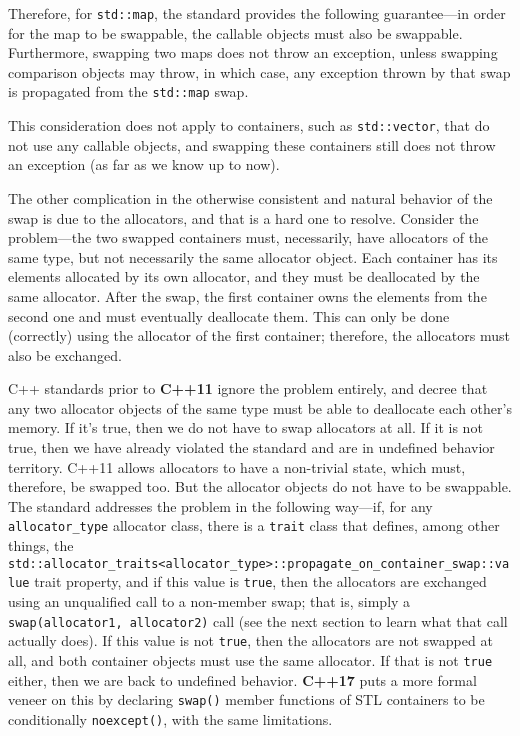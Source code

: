 Therefore, for \texttt{std::map}, the standard provides the following guarantee---in order for the map to be swappable, the callable objects must also be swappable. Furthermore, swapping two maps does not throw an exception, unless swapping comparison objects may throw, in which case, any exception thrown by that swap is propagated from the \texttt{std::map} swap.

This consideration does not apply to containers, such as \texttt{std::vector}, that do not use any callable objects, and swapping these containers still does not throw an exception (as far as we know up to now).

The other complication in the otherwise consistent and natural behavior of the swap is due to the allocators, and that is a hard one to resolve. Consider the problem---the two swapped containers must, necessarily, have allocators of the same type, but not necessarily the same allocator object. Each container has its elements allocated by its own allocator, and they must be deallocated by the same allocator. After the swap, the first container owns the elements from the second one and must eventually deallocate them. This can only be done (correctly) using the allocator of the first container; therefore, the allocators must also be exchanged.

C++ standards prior to \textbf{C++11} ignore the problem entirely, and decree that any two allocator objects of the same type must be able to deallocate each other's memory. If it's true, then we do not have to swap allocators at all. If it is not true, then we have already violated the standard and are in undefined behavior territory. C++11 allows allocators to have a non-trivial state, which must, therefore, be swapped too. But the allocator objects do not have to be swappable. The standard addresses the problem in the following way---if, for any \texttt{allocator\_type} allocator class, there is a \texttt{trait} class that defines, among other things, the \texttt{std::allocator\_traits\textless{}allocator\_type\textgreater{}::propagate\_on\_container\_swap::value} trait property, and if this value is \texttt{true}, then the allocators are exchanged using an unqualified call to a non-member swap; that is, simply a \texttt{swap(allocator1,\ allocator2)} call (see the next section to learn what that call actually does). If this value is not \texttt{true}, then the allocators are not swapped at all, and both container objects must use the same allocator. If that is not \texttt{true} either, then we are back to undefined behavior. \textbf{C++17} puts a more formal veneer on this by declaring \texttt{swap()} member functions of STL containers to be conditionally \texttt{noexcept()}, with the same limitations.

